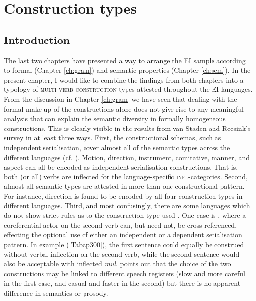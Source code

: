 \chapter{Construction types} \label{ch:constructions}
\section{Introduction}

\largerpage[2]
The last two chapters have presented a way to arrange the EI sample according to formal (Chapter \ref{ch:gram}) and semantic properties (Chapter \ref{ch:sem}). In the present chapter, I would like to combine the findings from both chapters into a typology of \textsc{multi-verb construction} types attested throughout the EI languages. From the discussion in Chapter \ref{ch:gram} we have seen that dealing with the formal make-up of the constructions alone does not give rise to any meaningful analysis that can explain the semantic diversity in formally homogeneous constructions. This is clearly visible in the results from van Staden and Reesink's survey in at least three ways. First, the constructional schemas, such as independent serialisation, cover almost all of the semantic types across the different languages (cf. \citealt[34]{vanstaden2008serial}). Motion, direction, instrument, comitative, manner, and aspect can all be encoded as independent serialisation constructions. That is, both (or all) verbs are inflected for the language-specific \textsc{infl}-categories. Second, almost all semantic types are attested in more than one constructional pattern. For instance, direction is found to be encoded by all four construction types in different languages. Third, and most confusingly, there are some languages which do not show strict rules as to the construction type used \citep[24f.]{vanstaden2008serial}. One case is , where a coreferential actor on the second verb can, but need not, be cross-referenced, effecting the optional use of either an independent  or a dependent serialisation pattern. In example (\ref{Tabap300}), the first sentence could equally be construed without verbal inflection on the second verb, while the second sentence would also be acceptable with inflected \textit{mul}. \citet[300]{bowden2001taba} points out that the choice of the two constructions may be linked to different speech registers (slow and more careful in the first case, and casual and faster in the second) but there is no apparent difference in semantics or prosody.

